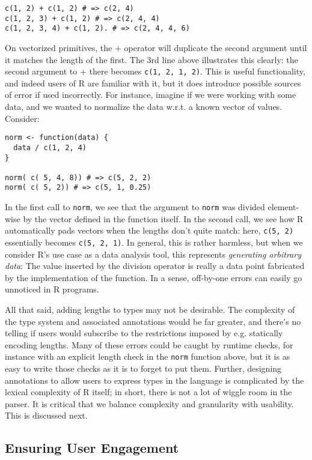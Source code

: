 \documentclass[sigplan,10pt,review,anonymous]{acmart}\settopmatter{printfolios=true,printccs=false,printacmref=false}
\begin{document}
\begin{lstlisting}
c(1, 2) + c(1, 2) # => c(2, 4)
c(1, 2, 3) + c(1, 2) # => c(2, 4, 4)
c(1, 2, 3, 4) + c(1, 2). # => c(2, 4, 4, 6)
\end{lstlisting}

On vectorized primitives, the $+$ operator will duplicate the second argument until it matches the length of the first.
The 3rd line above illustrates this clearly: the second argument to $+$ there becomes {\tt c(1, 2, 1, 2)}.
This is useful functionality, and indeed users of R are familiar with it, but it does introduce possible sources of error if used incorrectly.
For instance, imagine if we were working with some data, and we wanted to normalize the data w.r.t. a known vector of values.
Consider:

\begin{lstlisting}
norm <- function(data) {
  data / c(1, 2, 4)
}

norm( c( 5, 4, 8)) # => c(5, 2, 2)
norm( c( 5, 2)) # => c(5, 1, 0.25)
\end{lstlisting}

In the first call to {\tt norm}, we see that the argument to {\tt norm} was divided element-wise by the vector defined in the function itself.
In the second call, we see how R automatically pads vectors when the lengths don't quite match: here, {\tt c(5, 2)} essentially becomes {\tt c(5, 2, 1)}.
In general, this is rather harmless, but when we consider R's use case as a data analysis tool, this represents {\it generating arbitrary data}: 
The value inserted by the division operator is really a data point fabricated by the implementation of the function.
In a sense, off-by-one errors can easily go unnoticed in R programs.

All that said, adding lengths to types may not be desirable.
The complexity of the type system and associated annotations would be far greater, and there's no telling if users would subscribe to the restrictions imposed by e.g. statically encoding lengths.
Many of these errors could be caught by runtime checks, for instance with an explicit length check in the {\tt norm} function above, but it is as easy to write those checks as it is to forget to put them.
Further, designing annotations to allow users to express types in the language is complicated by the lexical complexity of R itself; in short, there is not a lot of wiggle room in the parser.
It is critical that we balance complexity and granularity with usability.
This is discussed next.

%
%
\subsection{Ensuring User Engagement}
\end{document}
